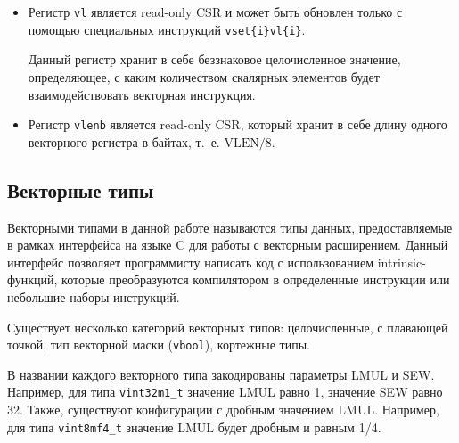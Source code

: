 \begin{itemize}
\item Регистр \texttt{vl} является read-only CSR и может быть обновлен только с помощью
специальных инструкций \texttt{vset\{i\}vl\{i\}}.

Данный регистр хранит в себе беззнаковое целочисленное значение, определяющее, с
каким количеством скалярных элементов будет взаимодействовать векторная инструкция.

\item Регистр \texttt{vlenb} является read-only CSR, который хранит в себе длину одного
векторного регистра в байтах, т.~е. $\text{VLEN} / 8$.

\end{itemize}

\subsection {Векторные типы}
\label{riscv:rvv_intrinsic}

Векторными типами в данной работе называются типы данных, предоставляемые в рамках
интерфейса на языке C для работы с векторным расширением. Данный интерфейс позволяет
программисту написать код с использованием intrinsic-функций, которые преобразуются
компилятором в определенные инструкции или небольшие наборы инструкций.

Существует несколько категорий векторных типов: целочисленные, с плавающей точкой, 
тип векторной маски (\texttt{vbool}), кортежные типы.

В названии каждого векторного типа закодированы параметры LMUL и SEW. Например, для типа
\texttt{vint32m1\_t} значение LMUL равно 1, значение SEW равно 32. Также, существуют
конфигурации с дробным значением LMUL. Например, для типа \texttt{vint8mf4\_t} значение 
LMUL будет дробным и равным 1/4.

